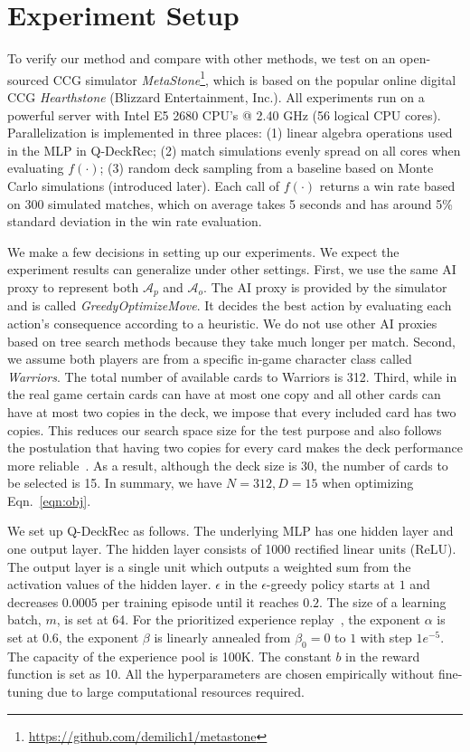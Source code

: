 \section{Experiment Setup}\label{sec:exp}
To verify our method and compare with other methods, we test on an open-sourced CCG simulator \textit{MetaStone}\footnote{\url{https://github.com/demilich1/metastone}}, which is  based on the popular online digital CCG \textit{Hearthstone} (Blizzard Entertainment, Inc.). All experiments run on a powerful server with Intel E5 2680 CPU’s @ 2.40 GHz (56 logical CPU cores). Parallelization is implemented in three places: (1) linear algebra operations used in the MLP in Q-DeckRec; (2) match simulations evenly spread on all cores when evaluating $f(\cdot)$; (3) random deck sampling from a baseline based on Monte Carlo simulations (introduced later). Each call of $f(\cdot)$ returns a win rate based on 300 simulated matches, which on average takes 5 seconds and has around 5\% standard deviation in the win rate evaluation. 

We make a few decisions in setting up our experiments. We expect the experiment results can generalize under other settings. First, we use the same AI proxy to represent both $\mathcal{A}_p$ and $\mathcal{A}_o$. The AI proxy is provided by the simulator and is called \textit{GreedyOptimizeMove}. It decides the best action by evaluating each action's consequence according to a heuristic. We do not use other AI proxies based on tree search methods because they take much longer per match. Second, we assume both players are from a specific in-game character class called \textit{Warriors}. The total number of available cards to Warriors is 312. Third, while in the real game certain cards can have at most one copy and all other cards can have at most two copies in the deck, we impose that every included card has two copies. This reduces our search space size for the test purpose and also follows the postulation that having two copies for every card makes the deck performance more reliable~\cite{garcia2016evolutionary}. As a result, although the deck size is 30, the number of cards to be selected is 15. In summary, we have $N=312, D=15$ when optimizing Eqn.~\ref{eqn:obj}.
    

We set up Q-DeckRec as follows. The underlying MLP has one hidden layer and one output layer. The hidden layer consists of 1000 rectified linear units (ReLU). The output layer is a single unit which outputs a weighted sum from the activation values of the hidden layer. $\epsilon$ in the $\epsilon$-greedy policy starts at $1$ and decreases $0.0005$ per training episode until it reaches $0.2$. The size of a learning batch, $m$, is set at 64. For the prioritized experience replay~\cite{schaul2015prioritized}, the exponent $\alpha$ is set at 0.6, the exponent $\beta$ is linearly annealed from $\beta_0=0$ to $1$ with step $1e^{-5}$. The capacity of the experience pool is 100K. The constant $b$ in the reward function is set as 10. All the hyperparameters are chosen empirically without fine-tuning due to large computational resources required.  

